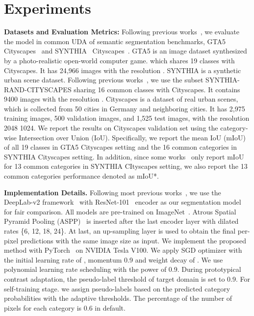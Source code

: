\documentclass[runningheads]{llncs}
\begin{document}
\section{Experiments}
\noindent \textbf{Datasets and Evaluation Metrics:}
Following previous works~\cite{wang2020classes,li2021semantic}, we evaluate the model in common UDA of semantic segmentation benchmarks, GTA5~\cite{richter2016playing}  Cityscapes~\cite{cordts2016cityscapes} and SYNTHIA~\cite{ros2016synthia}  Cityscapes~\cite{cordts2016cityscapes}. GTA5 is an image dataset synthesized by a photo-realistic open-world computer game. which shares 19 classes with Cityscapes. It has 24,966 images with the resolution   . SYNTHIA is a synthetic urban scene dataset. Following previous works~\cite{tsai2018learning}, we use the subset SYNTHIA-RAND-CITYSCAPES sharing 16 common classes with Cityscapes. It contains 9400 images with the resolution   . Cityscapes is a dataset of real urban scenes, which is collected from 50 cities in Germany and neighboring cities. It has 2,975 training images, 500 validation images, and 1,525 test images, with the resolution 2048  1024. We report the results on Cityscapes validation set using the category-wise Intersection over Union (IoU). Specifically, we report the mean IoU (mIoU) of all 19 classes in GTA5  Cityscapes setting and the 16 common categories in SYNTHIA  Cityscapes setting. In addition, since some works~\cite{tsai2018learning, luo2021category} only report mIoU for 13 common categories in SYNTHIA  CItyscapes setting, we also report the 13 common categories performance denoted as mIoU*.


\noindent \textbf{Implementation Details.} Following most previous works~\cite{hoffman2018cycada, wang2020classes, li2021semantic}, we use the DeepLab-v2 framework~\cite{chen2017deeplab} with ResNet-101~\cite{he2016deep} encoder as our segmentation model for fair comparison. All models are pre-trained on ImageNet~\cite{deng2009imagenet}. Atrous Spatial Pyramid Pooling (ASPP)~\cite{chen2017deeplab} is inserted after the last encoder layer with dilated rates \{6, 12, 18, 24\}. At last, an up-sampling layer is used to obtain the final per-pixel predictions with the same image size as input. We implement the proposed method with PyTorch~\cite{paszke2019pytorch} on NVIDIA Tesla V100. We apply SGD optimizer with the initial learning rate of , momentum 0.9 and weight decay of . We use polynomial learning rate scheduling with the power of 0.9. During prototypical contrast adaptation, the pseudo-label threshold of target domain is set to 0.9. For self-training stage. we assign pseudo-labels based on the predicted category probabilities with the adaptive thresholds. The percentage  of the number of pixels for each category is 0.6 in default.
\end{document}

